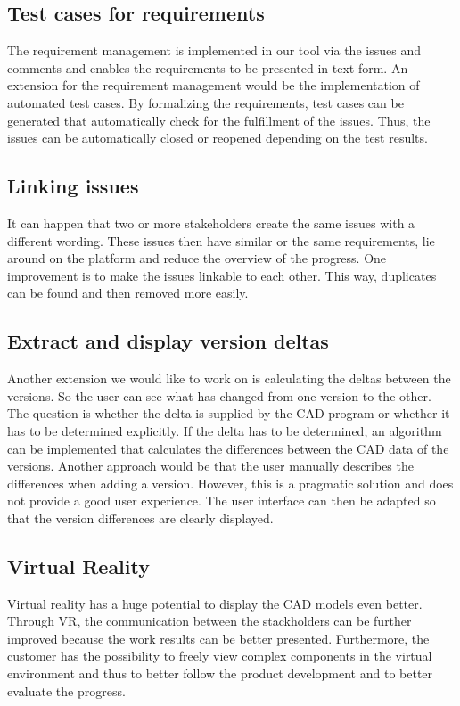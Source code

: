 \subsection*{Test cases for requirements}
The requirement management is implemented in our tool via the issues and comments and enables the requirements to be presented in text form. An extension for the requirement management would be the implementation of automated test cases. By formalizing the requirements, test cases can be generated that automatically check for the fulfillment of the issues. Thus, the issues can be automatically closed or reopened depending on the test results.

\subsection*{Linking issues}
It can happen that two or more stakeholders create the same issues with a different wording. These issues then have similar or the same requirements, lie around on the platform and reduce the overview of the progress. One improvement is to make the issues linkable to each other. This way, duplicates can be found and then removed more easily.

\subsection*{Extract and display version deltas}
Another extension we would like to work on is calculating the deltas between the versions. So the user can see what has changed from one version to the other. The question is whether the delta is supplied by the CAD program or whether it has to be determined explicitly. If the delta has to be determined, an algorithm can be implemented that calculates the differences between the CAD data of the versions. Another approach would be that the user manually describes the differences when adding a version. However, this is a pragmatic solution and does not provide a good user experience. The user interface can then be adapted so that the version differences are clearly displayed.

\subsection*{Virtual Reality}
Virtual reality has a huge potential to display the CAD models even better. Through VR, the communication between the stackholders can be further improved because the work results can be better presented. Furthermore, the customer has the possibility to freely view complex components in the virtual environment and thus to better follow the product development and to better evaluate the progress.

